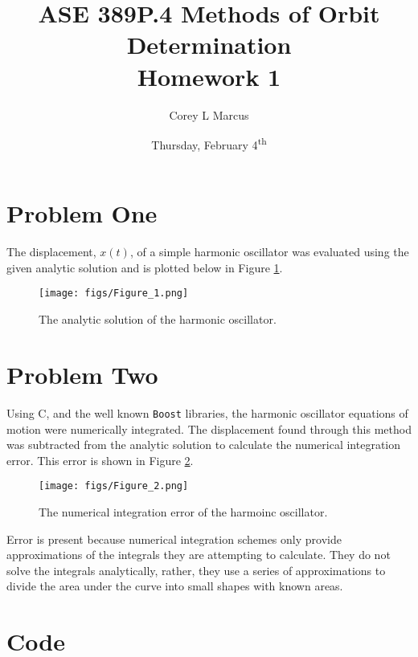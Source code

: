 \documentclass[11pt]{article}
\title{ASE 389P.4 Methods of Orbit Determination \\ Homework 1}
\author{Corey L Marcus} \date{Thursday, February 4\textsuperscript{th}}
\def\CC{{C\nolinebreak[4]\hspace{-.05em}\raisebox{.4ex}{\tiny\bf ++}}}
\begin{document}
\onehalfspace
\maketitle

\section{Problem One}
The displacement, $x(t)$, of a simple harmonic oscillator was evaluated using the given analytic solution and is plotted below in Figure \ref{fig:analytic}.

\begin{figure}[h!]
	\centering
	\texttt{[image: figs/Figure\_1.png]}
	\caption{The analytic solution of the harmonic oscillator.}
	\label{fig:analytic}
\end{figure}

\section{Problem Two}
Using \CC, and the well known \verb|Boost| libraries, the harmonic oscillator equations of motion were numerically integrated. The displacement found through this method was subtracted from the analytic solution to calculate the numerical integration error. This error is shown in Figure \ref{fig:numerr}.

\begin{figure}
	\centering
	\texttt{[image: figs/Figure\_2.png]}
	\caption{The numerical integration error of the harmoinc oscillator.}
	\label{fig:numerr}
\end{figure}

Error is present because numerical integration schemes only provide approximations of the integrals they are attempting to calculate. They do not solve the integrals analytically, rather, they use a series of approximations to divide the area under the curve into small shapes with known areas.

\newpage
\appendix
\section{Code}


\end{document}
